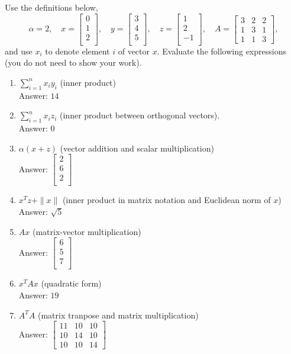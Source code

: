 \documentclass{article}
\def\blu#1{{\color{blu}#1}}
\def\gre#1{{\color{gre}#1}}
\def\norm#1{\|#1\|}
\def\enum#1{\begin{enumerate}#1\end{enumerate}}
\def\ans#1{\gre{Answer: #1}}{}
\begin{document}
Use the definitions below,
\[
\alpha = 2,\quad
x = \left[\begin{array}{c}
0\\
1\\
2\\
\end{array}\right], \quad
y = \left[\begin{array}{c}
3\\
4\\
5\\
\end{array}\right],\quad
z = \left[\begin{array}{c}
1\\
2\\
-1\\
\end{array}\right],\quad
A = \left[\begin{array}{ccc}
3 & 2 & 2\\
1 & 3 & 1\\
1 & 1 & 3
\end{array}\right],
\]
and use $x_i$ to denote element $i$ of vector $x$.
\blu{Evaluate the following expressions} (you do not need to show your work).
\enum{
\item $\sum_{i=1}^n x_iy_i$ (inner product) \\
\ans{$14$}
\item $\sum_{i=1}^n x_iz_i$ (inner product between orthogonal vectors). \\
\ans{$0$}
\item $\alpha(x+z)$ (vector addition and scalar multiplication) \\
\ans{$\left[\begin{array}{c}
		2\\
		6\\
		2\\
	\end{array}\right]$}
\item $x^Tz + \norm{x}$ (inner product in matrix notation and Euclidean norm of $x$) \\
\ans{$\sqrt{5}$}
\item $Ax$ (matrix-vector multiplication) \\
\ans{$\left[\begin{array}{c}
	6\\
	5\\
	7\\
	\end{array}\right]$}
\item $x^TAx$ (quadratic form) \\
\ans{$19$}
\item $A^TA$ (matrix tranpose and matrix multiplication) \\
\ans{$\left[\begin{array}{ccc}
	11 & 10 & 10\\
	10 & 14 & 10\\
	10 & 10 & 14
	\end{array}\right]$}
}
\end{document}
